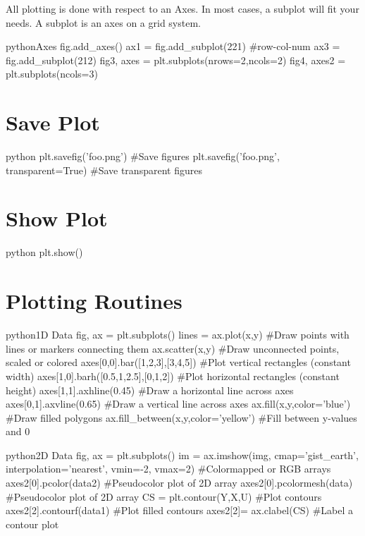 All plotting is done with respect to an Axes. In most cases, a subplot will fit your needs.
A subplot is an axes on a grid system.

\begin{codebox}{python}{Axes}
fig.add_axes()
ax1 = fig.add_subplot(221)  #row-col-num
ax3 = fig.add_subplot(212)
fig3, axes = plt.subplots(nrows=2,ncols=2)
fig4, axes2 = plt.subplots(ncols=3)
\end{codebox}


\section{Save Plot}

\begin{codebox}{python}{}
plt.savefig('foo.png')  #Save figures
plt.savefig('foo.png', transparent=True)  #Save transparent figures
\end{codebox}


\section{Show Plot}

\begin{codebox}{python}{}
plt.show()
\end{codebox}


\section{Plotting Routines}

\begin{codebox}{python}{1D Data}
fig, ax = plt.subplots()
lines = ax.plot(x,y)  #Draw points with lines or markers connecting them
ax.scatter(x,y)  #Draw unconnected points, scaled or colored
axes[0,0].bar([1,2,3],[3,4,5])  #Plot vertical rectangles (constant width)
axes[1,0].barh([0.5,1,2.5],[0,1,2])  #Plot horizontal rectangles (constant height)
axes[1,1].axhline(0.45)  #Draw a horizontal line across axes
axes[0,1].axvline(0.65)  #Draw a vertical line across axes
ax.fill(x,y,color='blue')  #Draw filled polygons
ax.fill_between(x,y,color='yellow')  #Fill between y-values and 0
\end{codebox}

\begin{codebox}{python}{2D Data}
fig, ax = plt.subplots()
im = ax.imshow(img, cmap='gist_earth', interpolation='nearest', vmin=-2, vmax=2)  #Colormapped or RGB arrays
axes2[0].pcolor(data2)  #Pseudocolor plot of 2D array
axes2[0].pcolormesh(data)  #Pseudocolor plot of 2D array
CS = plt.contour(Y,X,U)  #Plot contours
axes2[2].contourf(data1)  #Plot filled contours
axes2[2]= ax.clabel(CS)  #Label a contour plot
\end{codebox}

